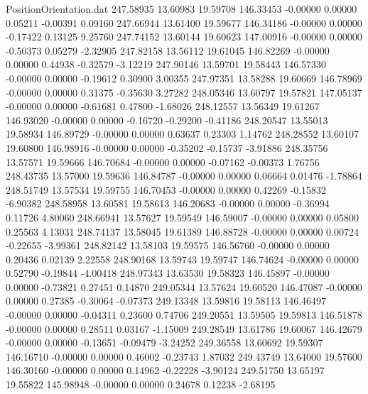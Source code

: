 \begin{filecontents}{PositionOrientation.dat}
 247.58935   13.60983   19.59708   146.33453   -0.00000    0.00000    0.05211   -0.00391    0.09160
 247.66944   13.61400   19.59677   146.34186   -0.00000    0.00000   -0.17422    0.13125    9.25760
 247.74152   13.60144   19.60623   147.00916   -0.00000    0.00000   -0.50373    0.05279   -2.32905
 247.82158   13.56112   19.61045   146.82269   -0.00000    0.00000    0.44938   -0.32579   -3.12219
 247.90146   13.59701   19.58443   146.57330   -0.00000    0.00000   -0.19612    0.30900    3.00355
 247.97351   13.58288   19.60669   146.78969   -0.00000    0.00000    0.31375   -0.35630    3.27282
 248.05346   13.60797   19.57821   147.05137   -0.00000    0.00000   -0.61681    0.47800   -1.68026
 248.12557   13.56349   19.61267   146.93020   -0.00000    0.00000   -0.16720   -0.29200   -0.41186
 248.20547   13.55013   19.58934   146.89729   -0.00000    0.00000    0.63637    0.23303    1.14762
 248.28552   13.60107   19.60800   146.98916   -0.00000    0.00000   -0.35202   -0.15737   -3.91886
 248.35756   13.57571   19.59666   146.70684   -0.00000    0.00000   -0.07162   -0.00373    1.76756
 248.43735   13.57000   19.59636   146.84787   -0.00000    0.00000    0.06664    0.01476   -1.78864
 248.51749   13.57534   19.59755   146.70453   -0.00000    0.00000    0.42269   -0.15832   -6.90382
 248.58958   13.60581   19.58613   146.20683   -0.00000    0.00000   -0.36994    0.11726    4.80060
 248.66941   13.57627   19.59549   146.59007   -0.00000    0.00000    0.05800    0.25563    4.13031
 248.74137   13.58045   19.61389   146.88728   -0.00000    0.00000    0.00724   -0.22655   -3.99361
 248.82142   13.58103   19.59575   146.56760   -0.00000    0.00000    0.20436    0.02139    2.22558
 248.90168   13.59743   19.59747   146.74624   -0.00000    0.00000    0.52790   -0.19844   -4.00418
 248.97343   13.63530   19.58323   146.45897   -0.00000    0.00000   -0.73821    0.27451    0.14870
 249.05344   13.57624   19.60520   146.47087   -0.00000    0.00000    0.27385   -0.30064   -0.07373
 249.13348   13.59816   19.58113   146.46497   -0.00000    0.00000   -0.04311    0.23600    0.74706
 249.20551   13.59505   19.59813   146.51878   -0.00000    0.00000    0.28511    0.03167   -1.15009
 249.28549   13.61786   19.60067   146.42679   -0.00000    0.00000   -0.13651   -0.09479   -3.24252
 249.36558   13.60692   19.59307   146.16710   -0.00000    0.00000    0.46002   -0.23743    1.87032
 249.43749   13.64000   19.57600   146.30160   -0.00000    0.00000    0.14962   -0.22228   -3.90124
 249.51750   13.65197   19.55822   145.98948   -0.00000    0.00000    0.24678    0.12238   -2.68195

\end{filecontents}

